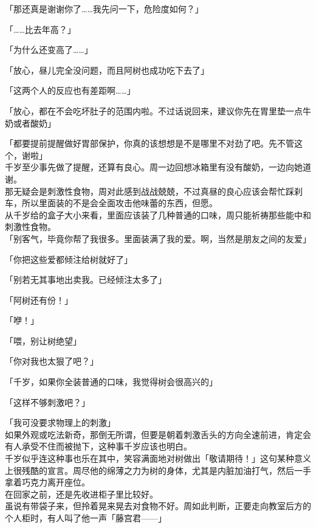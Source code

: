 「那还真是谢谢你了……我先问一下，危险度如何？」

「……比去年高？」

「为什么还变高了……」

「放心，昼儿完全没问题，而且阿树也成功吃下去了」

「这两个人的反应也有差距啊……」

「放心，都在不会吃坏肚子的范围内啦。不过话说回来，建议你先在胃里垫一点牛奶或者酸奶」

「都要提前提醒做好胃部保护，你真的该想想是不是哪里不对劲了吧。先不管这个，谢啦」\\

千岁至少事先做了提醒，还算有良心。周一边回想冰箱里有没有酸奶，一边向她道谢。\\

那无疑会是刺激性食物，周对此感到战战兢兢，不过真昼的良心应该会帮忙踩刹车，所以里面装的不是会全面攻击他味蕾的东西，但愿。\\

从千岁给的盒子大小来看，里面应该装了几种普通的口味，周只能祈祷那些能中和刺激性食物。\\

「别客气，毕竟你帮了我很多。里面装满了我的爱。啊，当然是朋友之间的友爱」

「你把这些爱都倾注给树就好了」

「别若无其事地出卖我。已经倾注太多了」

「阿树还有份！」

「咿！」

「喂，别让树绝望」

「你对我也太狠了吧？」

「千岁，如果你全装普通的口味，我觉得树会很高兴的」

「这样不够刺激吧？」

「我可没要求物理上的刺激」\\

如果外观或吃法新奇，那倒无所谓，但要是朝着刺激舌头的方向全速前进，肯定会有人承受不住而被抛下，这种事千岁应该也明白。\\

千岁似乎连这种事也乐在其中，笑容满面地对树做出「敬请期待！」这句某种意义上很残酷的宣言。周尽他的绵薄之力为树的身体，尤其是内脏加油打气，然后一手拿着巧克力离开座位。\\

在回家之前，还是先收进柜子里比较好。\\

虽说有带袋子来，但拎着晃来晃去对食物不好。周如此判断，正要走向教室后方的个人柜时，有人叫了他一声「藤宫君——」\\

